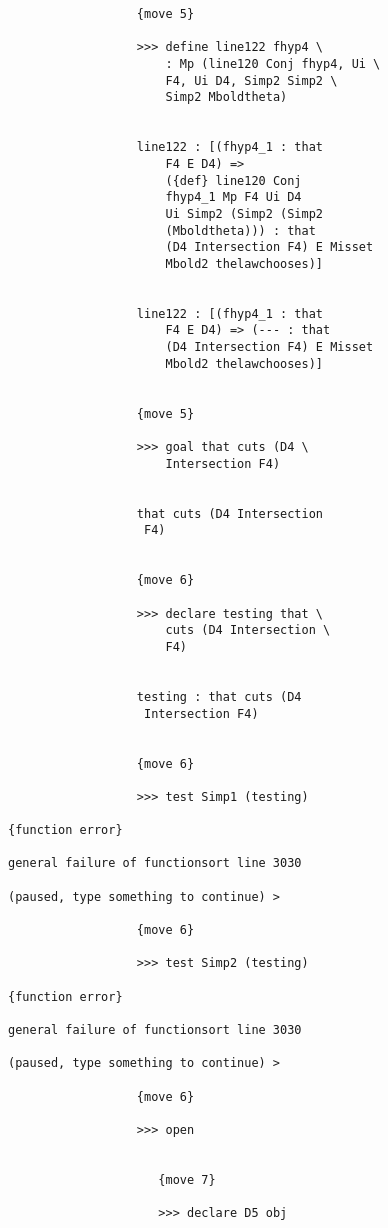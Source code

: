 \documentclass[12pt]{article}
\begin{document}
\begin{verbatim}
                  {move 5}

                  >>> define line122 fhyp4 \
                      : Mp (line120 Conj fhyp4, Ui \
                      F4, Ui D4, Simp2 Simp2 \
                      Simp2 Mboldtheta)


                  line122 : [(fhyp4_1 : that 
                      F4 E D4) => 
                      ({def} line120 Conj 
                      fhyp4_1 Mp F4 Ui D4 
                      Ui Simp2 (Simp2 (Simp2 
                      (Mboldtheta))) : that 
                      (D4 Intersection F4) E Misset 
                      Mbold2 thelawchooses)]


                  line122 : [(fhyp4_1 : that 
                      F4 E D4) => (--- : that 
                      (D4 Intersection F4) E Misset 
                      Mbold2 thelawchooses)]


                  {move 5}

                  >>> goal that cuts (D4 \
                      Intersection F4)


                  that cuts (D4 Intersection 
                   F4)


                  {move 6}

                  >>> declare testing that \
                      cuts (D4 Intersection \
                      F4)


                  testing : that cuts (D4 
                   Intersection F4)


                  {move 6}

                  >>> test Simp1 (testing)

{function error}

general failure of functionsort line 3030

(paused, type something to continue) >

                  {move 6}

                  >>> test Simp2 (testing)

{function error}

general failure of functionsort line 3030

(paused, type something to continue) >

                  {move 6}

                  >>> open


                     {move 7}

                     >>> declare D5 obj



\end{verbatim}
\end{document}
